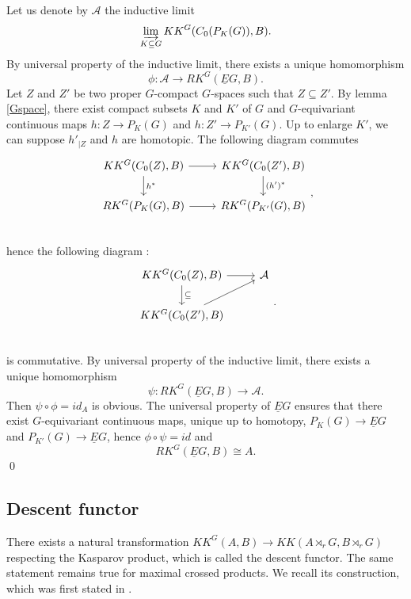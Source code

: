 \begin{dem} Let us denote by $\mathcal A$ the inductive limit 
\[\varinjlim_{K\subseteq G } KK^G(C_0(P_K(G)),B).\] 
By universal property of the inductive limit, there exists a unique homomorphism 
\[\phi : \mathcal A \rightarrow RK^G(\underline E G,B).\] 
Let $Z$ and $Z'$ be two proper $G$-compact $G$-spaces such that $Z\subseteq Z'$. By lemma \ref{Gspace}, there exist compact subsets $K$ and $K'$ of $G$ and $G$-equivariant continuous maps $h : Z\rightarrow P_K(G)$ and $h : Z'\rightarrow P_{K'}(G)$. Up to enlarge $K'$, we can suppose $h'_{|Z}$ and $ h $ are homotopic. The following diagram commutes
\[\begin{tikzcd}
KK^G(C_0(Z),B)\arrow{r}\arrow{d}{h^*} & KK^G(C_0(Z'),B)\arrow{d}{(h')^*} \\
RK^G(P_{K}(G),B)\arrow{r} & RK^G(P_{K'}(G),B) \\
\end{tikzcd},\]
hence the following  diagram :
\[\begin{tikzcd}
KK^G(C_0(Z),B)\arrow{r}\arrow{d}{\subseteq} & \mathcal A  \\
KK^G(C_0(Z'),B) \arrow{ur} &  \\
\end{tikzcd}.\]
is commutative. By universal property of the inductive limit, there exists a unique homomorphism 
\[ \psi : RK^G(\underline E G,B)\rightarrow \mathcal A.\] 
Then $\psi\circ\phi = id_A$ is obvious. The universal property of $\underline E G $ ensures that there exist $G$-equivariant continuous maps, unique up to homotopy, $P_{K}(G) \rightarrow  \underline E G$ and $P_{K'}(G)\rightarrow  \underline E G$, hence $\phi\circ \psi = id$ and 
\[RK^G(\underline E G,B) \cong A.\]
\qed
\end{dem}

\subsection{Descent functor}

There exists a natural transformation $KK^G(A,B)\rightarrow KK(A\rtimes_r G, B\rtimes_r G)$ respecting the Kasparov product, which is called the descent functor. The same statement remains true for maximal crossed products. We recall its construction, which was first stated in \cite{LeGall}.\\
 
